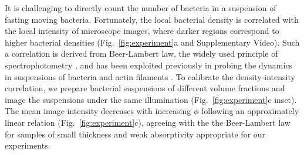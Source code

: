 \documentclass[twocolumn,aps,prl,amsmath,amssymb,longbibliography]{revtex4-2}
\begin{document}
It is challenging to directly count the number of bacteria in a suspension of fasting moving bacteria. Fortunately, the local bacterial density is correlated with the local intensity of microscope images, where darker regions correspond to higher bacterial densities (Fig.~\ref{fig:experiment}a and Supplementary Video). Such a correlation is derived from Beer-Lambert law, the widely used principle of spectrophotometry \cite{Tortora2018}, and has been exploited previously in probing the dynamics in suspensions of bacteria and actin filaments \cite{Sokolov2009, Wilson2011, Schaller2013}.
To calibrate the density-intensity correlation, we prepare bacterial suspensions of different volume fractions and image the suspensions under the same illumination (Fig.~\ref{fig:experiment}c inset). The mean image intensity decreases with increasing $\phi$ following an approximately linear relation (Fig.~\ref{fig:experiment}c), agreeing with the the Beer-Lambert law for samples of small thickness and weak absorptivity appropriate for our experiments.

\end{document}
